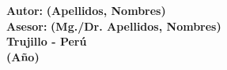 \begin{center}
		{\ArialNarrow\fontsize{18pt}{21.6pt}\selectfont \textbf{Autor:} \textbf{(Apellidos, Nombres)}}\\
		\vspace{7 mm}
		{\ArialNarrow\fontsize{18pt}{21.6pt}\selectfont \textbf{Asesor:} \textbf{(Mg./Dr. Apellidos, Nombres)}}\\
		\vspace{22 mm}	
		{\large \textbf{Trujillo - Perú} }\\
		\vspace{4.5 mm}	
		{\large \textbf{(Año)} }\\

	\end{center}


